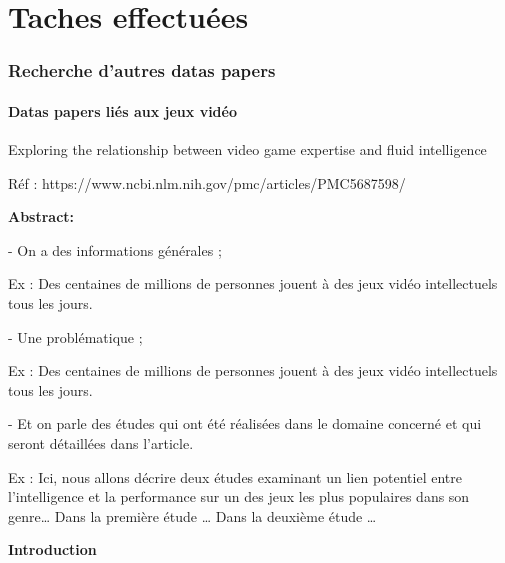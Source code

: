\documentclass[11pt,oneside]{article}
\begin{document}
\part*{Taches effectuées}
\section*{Recherche d'autres datas papers}
\subsection*{Datas papers liés aux jeux vidéo}
\begin{flushleft}
Exploring the relationship between video game expertise and fluid intelligence
\end{flushleft}

\begin{flushleft}
Réf : https://www.ncbi.nlm.nih.gov/pmc/articles/PMC5687598/
\end{flushleft}

\begin{flushleft}
\textbf{Abstract:}
\end{flushleft}

-	On a des informations générales ;

\begin{flushleft}
Ex : Des centaines de millions de personnes jouent à des jeux vidéo intellectuels tous les jours.
\end{flushleft}

-	Une problématique ;

\begin{flushleft}
Ex : Des centaines de millions de personnes jouent à des jeux vidéo intellectuels tous les jours.
\end{flushleft}

-	Et on parle des études qui ont été réalisées dans le domaine concerné et qui seront détaillées dans l’article.

\begin{flushleft}
Ex : Ici, nous allons décrire deux études examinant un lien potentiel entre l’intelligence et la performance sur un des jeux les plus populaires dans son genre… Dans la première étude … Dans la deuxième étude …
\end{flushleft}

\newpage

\begin{flushleft}
\textbf{Introduction}
\end{flushleft}
\end{document}
